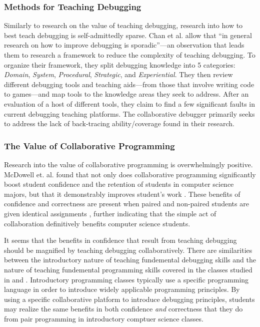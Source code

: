 \documentclass[12pt]{article}
\begin{document}
\subsubsection{Methods for Teaching Debugging}

Similarly to research on the value of teaching debugging, research
into how to best teach debugging is self-admittedly sparse.  Chan et
al. allow that ``in general research on how to improve debugging is
sporadic''---an observation that leads them to research a framework to
reduce the complexity of teaching
debugging\cite{10.1145/3286960.3286970}.  To organize their framework,
they split debugging knowledge into 5 categories: \textit{Domain},
\textit{System}, \textit{Procedural}, \textit{Strategic}, and
\textit{Experiential}.  They then review different debugging tools and
teaching aids---from those that involve writing code to games---and
map tools to the knowledge areas they seek to address.  After an
evaluation of a host of different tools, they claim to find a few
significant faults in current debugging teaching platforms.  The
collaborative debugger primarily seeks to address the lack of
back-tracing ability/coverage found in their research.

\subsubsection{The Value of Collaborative Programming}

Research into the value of collaborative programming is overwhelmingly
positive.  McDowell et. al. found that not only does collaborative
programming significantly boost student confidence and the retention
of students in computer science majors, but that it demonstrably
improves student's work \cite{10.1145/1145287.1145293}.  These
benefits of confidence and correctness are present when paired and
non-paired students are given identical assignments
\cite{10.1145/1026487.1008043}, further indicating that the simple act
of collaboration definitively benefits computer science students.\par

It seems that the benefits in confidence that result from teaching
debugging should be magnified by teaching debugging collaboratively.
There are similarities between the introductory nature of teaching
fundemental debugging skills and the nature of teaching fundemental
programming skills covered in the classes studied in
\cite{10.1145/1026487.1008043} and \cite{10.1145/1145287.1145293}.
Introductory programming classes typically use a specific programming
language in order to introduce widely applicable programming
principles.  By using a specific collaborative platform to introduce
debugging principles, students may realize the same benefits in both
confidence \textit{and} correctness that they do from pair programming
in introductory comptuer science classes.\par
\end{document}
